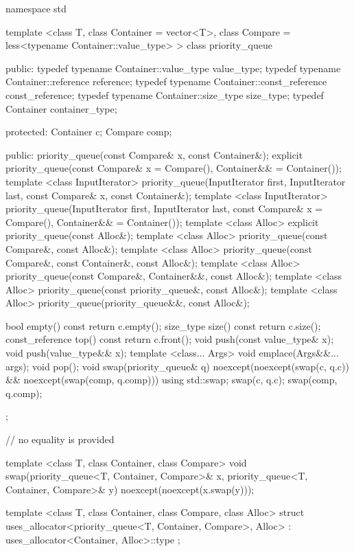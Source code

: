 \begin{codeblock}
namespace std {
  template <class T, class Container = vector<T>,
    class Compare = less<typename Container::value_type> >
  class priority_queue {
  public:
    typedef typename Container::value_type            value_type;
    typedef typename Container::reference             reference;
    typedef typename Container::const_reference       const_reference;
    typedef typename Container::size_type             size_type;
    typedef          Container                        container_type;

  protected:
    Container c;
    Compare comp;

  public:
    priority_queue(const Compare& x, const Container&);
    explicit priority_queue(const Compare& x = Compare(), Container&& = Container());
    template <class InputIterator>
      priority_queue(InputIterator first, InputIterator last,
             const Compare& x, const Container&);
    template <class InputIterator>
      priority_queue(InputIterator first, InputIterator last,
             const Compare& x = Compare(), Container&& = Container());
    template <class Alloc> explicit priority_queue(const Alloc&);
    template <class Alloc> priority_queue(const Compare&, const Alloc&);
    template <class Alloc> priority_queue(const Compare&, const Container&, const Alloc&);
    template <class Alloc> priority_queue(const Compare&, Container&&, const Alloc&);
    template <class Alloc> priority_queue(const priority_queue&, const Alloc&);
    template <class Alloc> priority_queue(priority_queue&&, const Alloc&);

    bool      empty() const       { return c.empty(); }
    size_type size()  const       { return c.size(); }
    const_reference   top() const { return c.front(); }
    void push(const value_type& x);
    void push(value_type&& x);
    template <class... Args> void emplace(Args&&... args);
    void pop();
    void swap(priority_queue& q) noexcept(noexcept(swap(c, q.c)) &&
                                          noexcept(swap(comp, q.comp)))
      { using std::swap; swap(c, q.c); swap(comp, q.comp); }
  };

  // no equality is provided

  template <class T, class Container, class Compare>
    void swap(priority_queue<T, Container, Compare>& x,
              priority_queue<T, Container, Compare>& y) noexcept(noexcept(x.swap(y)));

  template <class T, class Container, class Compare, class Alloc>
    struct uses_allocator<priority_queue<T, Container, Compare>, Alloc>
      : uses_allocator<Container, Alloc>::type { };
}
\end{codeblock}

